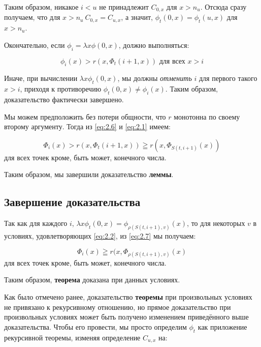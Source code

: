 \documentclass[a4paper,12pt]{report}
\begin{document}
Таким образом, никакое $i < u$ не принадлежит $C_{0,x}$ для $x > n_u$. Отсюда сразу получаем, что для $x > n_u \ C_{0,x} = C_{u,x}$, а значит, $\phi_t(0, x) = \phi_t(u, x)$ для $x > n_u$.

Окончательно, если $\phi_i = \lambda x \phi(0, x)$, должно выполняться:

\begin{equation} \label{eq:2.6}
\phi_i(x) > r(x, \Phi_t(i+1, x)) \mbox{ для всех } x > i
\end{equation}

Иначе, при вычислении $\lambda x \phi_t(0,x)$, мы должны \textit{отменить} $i$ для первого такого $x > i$, приходя к противоречию $\phi_t(0,x) \ne \phi_i(x)$. Таким образом, доказательство фактически завершено.

Мы можем предположить без потери общности, что $r$ монотонна по своему второму аргументу. Тогда из \eqref{eq:2.6} и \eqref{eq:2.1} имеем:

\begin{equation} \label{eq:2.7}
\Phi_i(x) > r(x, \Phi_t(i+1, x)) \geqq r(x, \Phi_{S(t, i+1)}(x))
\end{equation}
для всех точек кроме, быть может, конечного числа.

Таким образом, мы завершили доказательство \textbf{леммы}.

\subsection{Завершение доказательства}

Так как для каждого $i$, $\lambda x \phi_t(0, x) = \phi_{\rho(S(t, i+1), v)}(x)$, то для некоторых $v$ в условиях, удовлетворяющих \eqref{eq:2.2}, из \eqref{eq:2.7} мы получаем:

\begin{equation} \label{eq:2.8}
\Phi_i(x) \geqq r(x, \Phi_{\rho(S(t, i+1), v)}(x)
\end{equation}
для всех точек кроме, быть может, конечного числа.

Таким образом, \textbf{теорема} доказана при данных условиях.

Как было отмечено ранее, доказательство \textbf{теоремы} при произвольных условиях не привязано к рекурсивному отношению, но прямое доказательство при произвольных условиях может быть получено изменением приведённого выше доказательства. Чтобы его провести, мы просто определим $\phi_t$ как приложение рекурсивной теоремы, изменяя определение $C_{u,x}$ на:
\end{document}
